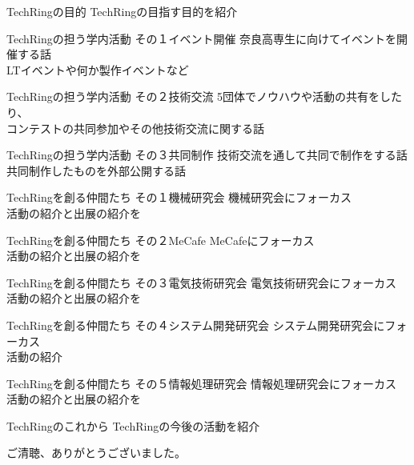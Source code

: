 \documentclass[dvipdfmx]{beamer}
\begin{document}
\begin{frame}{TechRingの目的}
  TechRingの目指す目的を紹介
\end{frame}

\begin{frame}{TechRingの担う学内活動 その１}{イベント開催}
  奈良高専生に向けてイベントを開催する話\\
  LTイベントや何か製作イベントなど
\end{frame}

\begin{frame}{TechRingの担う学内活動 その２}{技術交流}
  5団体でノウハウや活動の共有をしたり、\\
  コンテストの共同参加やその他技術交流に関する話
\end{frame}

\begin{frame}{TechRingの担う学内活動 その３}{共同制作}
  技術交流を通して共同で制作をする話\\
  共同制作したものを外部公開する話
\end{frame}

\begin{frame}{TechRingを創る仲間たち その１}{機械研究会}
  機械研究会にフォーカス\\
  活動の紹介と出展の紹介を
\end{frame}

\begin{frame}{TechRingを創る仲間たち その２}{MeCafe}
  MeCafeにフォーカス\\
  活動の紹介と出展の紹介を
\end{frame}

\begin{frame}{TechRingを創る仲間たち その３}{電気技術研究会}
  電気技術研究会にフォーカス\\
  活動の紹介と出展の紹介を
\end{frame}

\begin{frame}{TechRingを創る仲間たち その４}{システム開発研究会}
  システム開発研究会にフォーカス\\
  活動の紹介
\end{frame}

\begin{frame}{TechRingを創る仲間たち その５}{情報処理研究会}
  情報処理研究会にフォーカス\\
  活動の紹介と出展の紹介を
\end{frame}

\begin{frame}{TechRingのこれから}
  TechRingの今後の活動を紹介
\end{frame}

\begin{frame}
  \begin{Large}
    ご清聴、ありがとうございました。
  \end{Large}
\end{frame}
\end{document}
